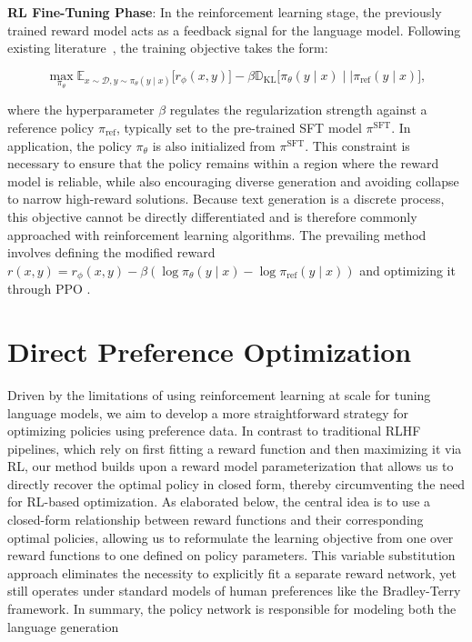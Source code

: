 \textbf{RL Fine-Tuning Phase}: In the reinforcement learning stage, the previously trained reward model acts as a feedback signal for the language model. Following existing literature~\citep{jaques2017sequence, jaques2020human}, the training objective takes the form:

\begin{equation}\label{eq:RL}
\max_{\pi_{\theta}}  \mathbb{E}_{x\sim \mathcal{D}, y\sim \pi_{\theta}(y \mid x)}\bigl[r_{\phi}(x, y)\bigr] - \beta\mathbb{D}_{\textrm{KL}}\bigl[\pi_{\theta}(y\mid x)\mid \mid \pi_\text{ref}(y\mid x)\bigr],
\end{equation}

where the hyperparameter $\beta$ regulates the regularization strength against a reference policy $\pi_\text{ref}$, typically set to the pre-trained SFT model $\pi^\text{SFT}$. In application, the policy $\pi_\theta$ is also initialized from $\pi^\text{SFT}$. This constraint is necessary to ensure that the policy remains within a region where the reward model is reliable, while also encouraging diverse generation and avoiding collapse to narrow high-reward solutions. Because text generation is a discrete process, this objective cannot be directly differentiated and is therefore commonly approached with reinforcement learning algorithms. The prevailing method \citep{ziegler2020finetuning, stiennon2022learning, bai2022training, ouyang2022training} involves defining the modified reward $r(x, y) = r_{\phi}(x, y) -\beta (\log \pi_{\theta}(y\mid x) - \log \pi_\text{ref}(y\mid x))$ and optimizing it through PPO \cite{schulman2017proximal}. 

\section{Direct Preference Optimization}\label{sec:DPO}

Driven by the limitations of using reinforcement learning at scale for tuning language models, we aim to develop a more straightforward strategy for optimizing policies using preference data. In contrast to traditional RLHF pipelines, which rely on first fitting a reward function and then maximizing it via RL, our method builds upon a reward model parameterization that allows us to directly recover the optimal policy in closed form, thereby circumventing the need for RL-based optimization. As elaborated below, the central idea is to use a closed-form relationship between reward functions and their corresponding optimal policies, allowing us to reformulate the learning objective from one over reward functions to one defined on policy parameters. This variable substitution approach eliminates the necessity to explicitly fit a separate reward network, yet still operates under standard models of human preferences like the Bradley-Terry framework. In summary, the policy network is responsible for modeling both the language generation

